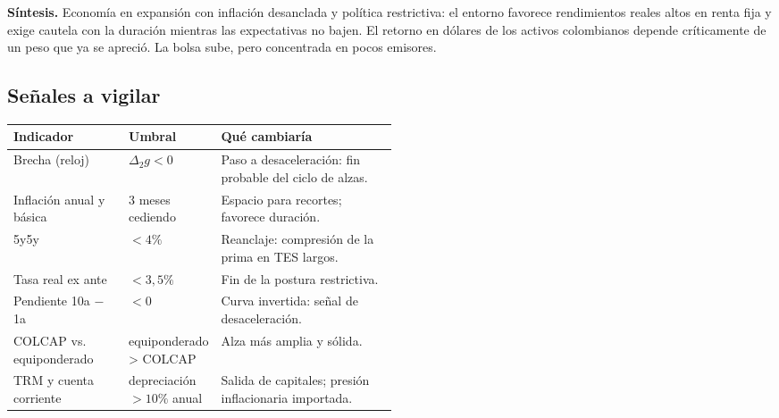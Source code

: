 \documentclass[11pt]{article}
\begin{document}
\textbf{Síntesis.} Economía en expansión con inflación desanclada y política restrictiva: el entorno favorece
rendimientos reales altos en renta fija y exige cautela con la duración mientras las expectativas no bajen. El
retorno en dólares de los activos colombianos depende críticamente de un peso que ya se apreció. La bolsa sube,
pero concentrada en pocos emisores.

\subsection{Señales a vigilar}
\begin{center}\small
\begin{tabularx}{\linewidth}{@{}p{0.3\linewidth}p{0.2\linewidth}X@{}}
\toprule
\textbf{Indicador} & \textbf{Umbral} & \textbf{Qué cambiaría}\\\midrule
Brecha (reloj) & $\Delta_2 g<0$ & Paso a desaceleración: fin probable del ciclo de alzas.\\
Inflación anual y básica & 3 meses cediendo & Espacio para recortes; favorece duración.\\
5y5y & $<4\%$ & Reanclaje: compresión de la prima en TES largos.\\
Tasa real ex ante & $<3{,}5\%$ & Fin de la postura restrictiva.\\
Pendiente 10a $-$ 1a & $<0$ & Curva invertida: señal de desaceleración.\\
COLCAP vs. equiponderado & equiponderado > COLCAP & Alza más amplia y sólida.\\
TRM y cuenta corriente & depreciación $>10\%$ anual & Salida de capitales; presión inflacionaria importada.\\
\bottomrule
\end{tabularx}
\end{center}

\end{document}
